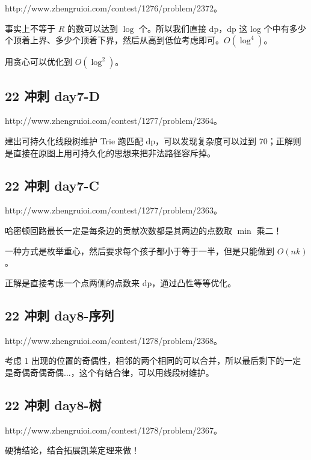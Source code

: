 \documentclass[UTF8,12pt,a4paper]{ctexart}
\begin{document}
	http://www.zhengruioi.com/contest/1276/problem/2372。
	
	事实上不等于 $R$ 的数可以达到 $\log$ 个。所以我们直接 dp，dp 这 log 个中有多少个顶着上界、多少个顶着下界，然后从高到低位考虑即可。$O(\log^4)$。
	
	用贪心可以优化到 $O(\log^2)$。
	
	\subsection*{22 冲刺 day7-D}
	
	http://www.zhengruioi.com/contest/1277/problem/2364。
	
	建出可持久化线段树维护 Trie 跑匹配 dp，可以发现复杂度可以过到 70；正解则是直接在原图上用可持久化的思想来把非法路径容斥掉。
	
	\subsection*{22 冲刺 day7-C}
	
	http://www.zhengruioi.com/contest/1277/problem/2363。
	
	哈密顿回路最长一定是每条边的贡献次数都是其两边的点数取 $\min$ 乘二！
	
	一种方式是枚举重心，然后要求每个孩子都小于等于一半，但是只能做到 $O(nk)$。
	
	正解是直接考虑一个点两侧的点数来 dp，通过凸性等等优化。
	
	\subsection*{22 冲刺 day8-序列}
	
	http://www.zhengruioi.com/contest/1278/problem/2368。
	
	考虑 $1$ 出现的位置的奇偶性，相邻的两个相同的可以合并，所以最后剩下的一定是奇偶奇偶奇偶...，这个有结合律，可以用线段树维护。
	
	\subsection*{22 冲刺 day8-树}
	
	http://www.zhengruioi.com/contest/1278/problem/2367。
	
	硬猜结论，结合拓展凯莱定理来做！
	
\end{document}
